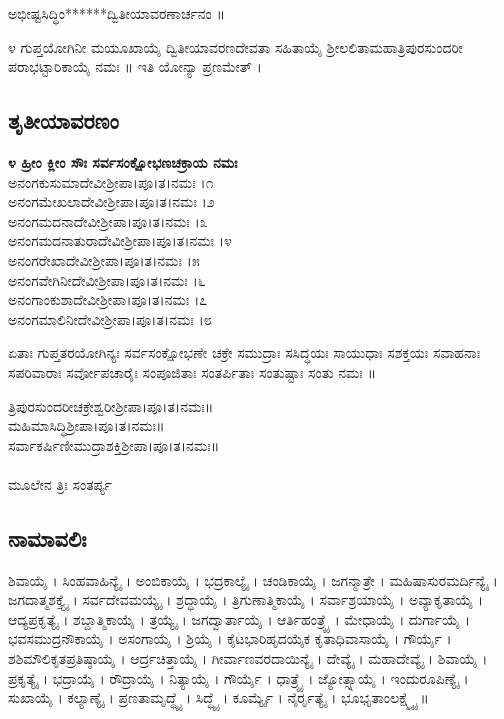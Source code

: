  ಅಭೀಷ್ಟಸಿದ್ಧಿಂ******ದ್ವಿತೀಯಾವರಣಾರ್ಚನಂ ॥

೪ ಗುಪ್ತಯೋಗಿನೀ ಮಯೂಖಾಯೈ ದ್ವಿತೀಯಾವರಣದೇವತಾ ಸಹಿತಾಯೈ ಶ್ರೀಲಲಿತಾಮಹಾತ್ರಿಪುರಸುಂದರೀ ಪರಾಭಟ್ಟಾರಿಕಾಯೈ ನಮಃ ॥ ಇತಿ ಯೋನ್ಯಾ ಪ್ರಣಮೇತ್ ।
\subsection{ತೃತೀಯಾವರಣಂ}
{\bfseries ೪ ಹ್ರೀಂ ಕ್ಲೀಂ ಸೌಃ ಸರ್ವಸಂಕ್ಷೋಭಣಚಕ್ರಾಯ ನಮಃ}\\
 ಅನಂಗಕುಸುಮಾದೇವೀಶ್ರೀಪಾ।ಪೂ।ತ।ನಮಃ ।೧\\
 ಅನಂಗಮೇಖಲಾದೇವೀಶ್ರೀಪಾ।ಪೂ।ತ।ನಮಃ ।೨\\
 ಅನಂಗಮದನಾದೇವೀಶ್ರೀಪಾ।ಪೂ।ತ।ನಮಃ ।೩\\
 ಅನಂಗಮದನಾತುರಾದೇವೀಶ್ರೀಪಾ।ಪೂ।ತ।ನಮಃ ।೪\\
 ಅನಂಗರೇಖಾದೇವೀಶ್ರೀಪಾ।ಪೂ।ತ।ನಮಃ ।೫\\
 ಅನಂಗವೇಗಿನೀದೇವೀಶ್ರೀಪಾ।ಪೂ।ತ।ನಮಃ ।೬\\
 ಅನಂಗಾಂಕುಶಾದೇವೀಶ್ರೀಪಾ।ಪೂ।ತ।ನಮಃ ।೭\\
 ಅನಂಗಮಾಲಿನೀದೇವೀಶ್ರೀಪಾ।ಪೂ।ತ।ನಮಃ ।೮

 ಏತಾಃ ಗುಪ್ತತರಯೋಗಿನ್ಯಃ ಸರ್ವಸಂಕ್ಷೋಭಣೇ ಚಕ್ರೇ ಸಮುದ್ರಾಃ ಸಸಿದ್ಧಯಃ ಸಾಯುಧಾಃ ಸಶಕ್ತಯಃ ಸವಾಹನಾಃ ಸಪರಿವಾರಾಃ ಸರ್ವೋಪಚಾರೈಃ ಸಂಪೂಜಿತಾಃ ಸಂತರ್ಪಿತಾಃ ಸಂತುಷ್ಟಾಃ ಸಂತು ನಮಃ ॥

  ತ್ರಿಪುರಸುಂದರೀಚಕ್ರೇಶ್ವರೀಶ್ರೀಪಾ।ಪೂ।ತ।ನಮಃ॥\\
 ಮಹಿಮಾಸಿದ್ಧಿಶ್ರೀಪಾ।ಪೂ।ತ।ನಮಃ॥\\
 ಸರ್ವಾಕರ್ಷಿಣೀಮುದ್ರಾಶಕ್ತಿಶ್ರೀಪಾ।ಪೂ।ತ।ನಮಃ॥\\
\\
ಮೂಲೇನ ತ್ರಿಃ ಸಂತರ್ಪ್ಯ

\subsection{ನಾಮಾವಲಿಃ}
ಶಿವಾಯೈ । ಸಿಂಹವಾಹಿನ್ಯೈ । ಅಂಬಿಕಾಯೈ । ಭದ್ರಕಾಲ್ಯೈ । ಚಂಡಿಕಾಯೈ । ಜಗನ್ಮಾತ್ರೇ । ಮಹಿಷಾಸುರಮರ್ದಿನ್ಯೈ । ಜಗದಾತ್ಮಶಕ್ತ್ಯೈ । ಸರ್ವದೇವಮಯ್ಯೈ । ಶ್ರದ್ಧಾಯೈ । ತ್ರಿಗುಣಾತ್ಮಿಕಾಯೈ । ಸರ್ವಾಶ್ರಯಾಯೈ । ಅವ್ಯಾಕೃತಾಯೈ । ಆದ್ಯಪ್ರಕೃತ್ಯೈ । ಶಬ್ದಾತ್ಮಿಕಾಯೈ । ತ್ರಯ್ಯೈ । ಜಗದ್ವಾರ್ತಾಯೈ । ಆರ್ತಿಹಂತ್ರ್ಯೈ । ಮೇಧಾಯೈ । ದುರ್ಗಾಯೈ । ಭವಸಮುದ್ರನೌಕಾಯೈ । ಅಸಂಗಾಯೈ । ಶ್ರಿಯೈ । ಕೈಟಭಾರಿಹೃದಯೈಕ ಕೃತಾಧಿವಾಸಾಯೈ । ಗೌರ್ಯೈ । ಶಶಿಮೌಲಿಕೃತಪ್ರತಿಷ್ಠಾಯೈ । ಆರ್ದ್ರಚಿತ್ತಾಯೈ । ಗೀರ್ವಾಣವರದಾಯಿನ್ಯೈ । ದೇವ್ಯೈ । ಮಹಾದೇವ್ಯೈ । ಶಿವಾಯೈ । ಪ್ರಕೃತ್ಯೈ । ಭದ್ರಾಯೈ । ರೌದ್ರಾಯೈ । ನಿತ್ಯಾಯೈ । ಗೌರ್ಯೈ । ಧಾತ್ರ್ಯೈ । ಜ್ಯೋತ್ಸ್ನಾಯೈ । ಇಂದುರೂಪಿಣ್ಯೈ । ಸುಖಾಯೈ । ಕಲ್ಯಾಣ್ಯೈ । ಪ್ರಣತಾಮೃದ್ಧ್ಯೈ । ಸಿದ್ಧ್ಯೈ । ಕೂರ್ಮ್ಯೈ । ನೈರ್ರೃತ್ಯೈ । ಭೂಭೃತಾಂಲಕ್ಷ್ಮ್ಯೈ ॥\\

